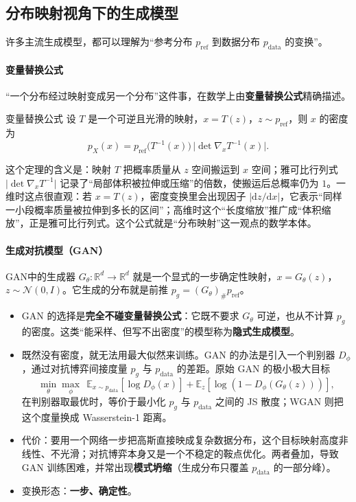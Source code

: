 \subsection{分布映射视角下的生成模型}

许多主流生成模型，都可以理解为“参考分布 $p_{\text{ref}}$ 到数据分布 $p_{\text{data}}$ 的变换”。

\paragraph{变量替换公式}
“一个分布经过映射变成另一个分布”这件事，在数学上由\textbf{变量替换公式}精确描述。

\begin{theorem}{变量替换公式}{}
设 $T$ 是一个可逆且光滑的映射，$x = T(z)$，$z\sim p_{\text{ref}}$，则 $x$ 的密度为
\begin{equation}
p_X(x) = p_{\text{ref}}\big(T^{-1}(x)\big)\,\big|\det \nabla_x T^{-1}(x)\big|.
\end{equation}
\end{theorem}
这个定理的含义是：映射 $T$ 把概率质量从 $z$ 空间搬运到 $x$ 空间；雅可比行列式 $\big|\det\nabla_x T^{-1}\big|$ 记录了“局部体积被拉伸或压缩”的倍数，使搬运后总概率仍为 $1$。一维时这点很直观：若 $x=T(z)$，密度变换里会出现因子 $|\mathrm dz/\mathrm dx|$，它表示“同样一小段概率质量被拉伸到多长的区间”；高维时这个“长度缩放”推广成“体积缩放”，正是雅可比行列式。这个公式就是“分布映射”这一观点的数学本体。

\paragraph{生成对抗模型（GAN）} GAN中的生成器 $G_\theta:\mathbb{R}^d\to\mathbb{R}^d$ 就是一个显式的一步确定性映射，$x = G_\theta(z)$，$z\sim\mathcal N(0,I)$。它生成的分布就是前推 $p_g = (G_\theta)_\# p_{\text{ref}}$。
\begin{itemize}
\item GAN 的选择是\textbf{完全不碰变量替换公式}：它既不要求 $G_\theta$ 可逆，也从不计算 $p_g$ 的密度。这类“能采样、但写不出密度”的模型称为\textbf{隐式生成模型}。
\item 既然没有密度，就无法用最大似然来训练。GAN 的办法是引入一个判别器 $D_\phi$，通过对抗博弈间接度量 $p_g$ 与 $p_{\text{data}}$ 的差距。原始 GAN 的极小极大目标
\begin{equation}
\min_\theta\max_\phi\ \ \mathbb{E}_{x\sim p_{\text{data}}}[\log D_\phi(x)] + \mathbb{E}_{z}[\log(1 - D_\phi(G_\theta(z)))],
\end{equation}
在判别器取最优时，等价于最小化 $p_g$ 与 $p_{\text{data}}$ 之间的 JS 散度；WGAN 则把这个度量换成 Wasserstein-1 距离。
\item 代价：要用一个网络一步把高斯直接映成复杂数据分布，这个目标映射高度非线性、不光滑；对抗博弈本身又是一个不稳定的鞍点优化。两者叠加，导致 GAN 训练困难，并常出现\textbf{模式坍缩}（生成分布只覆盖 $p_{\text{data}}$ 的一部分峰）。
\item 变换形态：\textbf{一步、确定性}。
\end{itemize}

